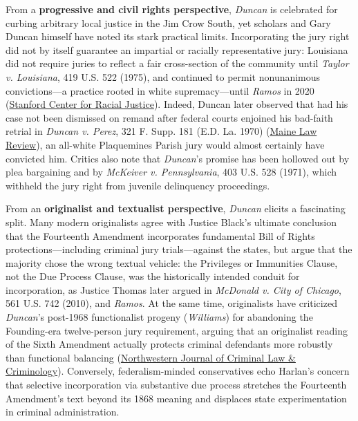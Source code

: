 \documentclass[12pt]{article}
\begin{document}
From a \textbf{progressive and civil rights perspective}, \textit{Duncan} is celebrated for curbing arbitrary local justice in the Jim Crow South, yet scholars and Gary Duncan himself have noted its stark practical limits. Incorporating the jury right did not by itself guarantee an impartial or racially representative jury: Louisiana did not require juries to reflect a fair cross-section of the community until \textit{Taylor v. Louisiana}, 419 U.S. 522 (1975), and continued to permit nonunanimous convictions---a practice rooted in white supremacy---until \textit{Ramos} in 2020 (\href{https://law.stanford.edu/2022/10/12/the-civil-rights-significance-of-duncan-v-louisiana-and-the-right-to-a-jury-trial/}{Stanford Center for Racial Justice}). Indeed, Duncan later observed that had his case not been dismissed on remand after federal courts enjoined his bad-faith retrial in \textit{Duncan v. Perez}, 321 F. Supp. 181 (E.D. La. 1970) (\href{https://digitalcommons.mainelaw.maine.edu/cgi/viewcontent.cgi?article=1572&context=mlr}{Maine Law Review}), an all-white Plaquemines Parish jury would almost certainly have convicted him. Critics also note that \textit{Duncan}'s promise has been hollowed out by plea bargaining and by \textit{McKeiver v. Pennsylvania}, 403 U.S. 528 (1971), which withheld the jury right from juvenile delinquency proceedings.

From an \textbf{originalist and textualist perspective}, \textit{Duncan} elicits a fascinating split. Many modern originalists agree with Justice Black's ultimate conclusion that the Fourteenth Amendment incorporates fundamental Bill of Rights protections---including criminal jury trials---against the states, but argue that the majority chose the wrong textual vehicle: the Privileges or Immunities Clause, not the Due Process Clause, was the historically intended conduit for incorporation, as Justice Thomas later argued in \textit{McDonald v. City of Chicago}, 561 U.S. 742 (2010), and \textit{Ramos}. At the same time, originalists have criticized \textit{Duncan}'s post-1968 functionalist progeny (\textit{Williams}) for abandoning the Founding-era twelve-person jury requirement, arguing that an originalist reading of the Sixth Amendment actually protects criminal defendants more robustly than functional balancing (\href{https://scholarlycommons.law.northwestern.edu/cgi/viewcontent.cgi?article=7801&context=jclc}{Northwestern Journal of Criminal Law \& Criminology}). Conversely, federalism-minded conservatives echo Harlan's concern that selective incorporation via substantive due process stretches the Fourteenth Amendment's text beyond its 1868 meaning and displaces state experimentation in criminal administration.
\end{document}
